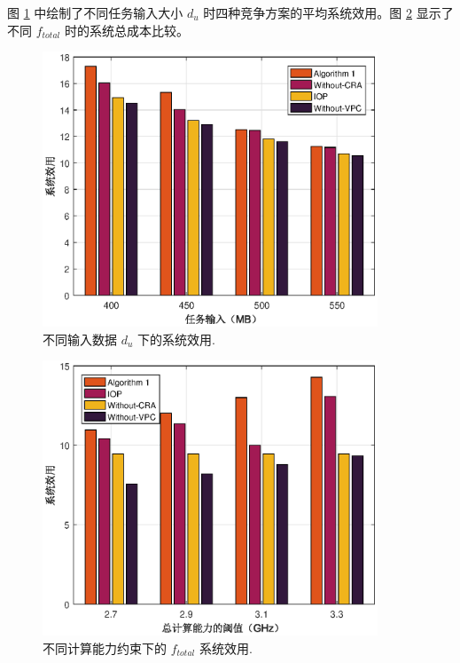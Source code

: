 图 \ref{F8} 中绘制了不同任务输入大小 $d_u$ 时四种竞争方案的平均系统效用。图 \ref{F9} 显示了不同 $f_{total}$ 时的系统总成本比较。
\begin{figure}[H]
\centering
\includegraphics[width=10cm]{figures//chap3//diff_dup.eps}
\caption{不同输入数据 $d_u$ 下的系统效用.}
\label{F8}
\end{figure}
\begin{figure}[H]
\centering
\includegraphics[width=10cm]{figures//chap3//diff_total.eps}
\caption{不同计算能力约束下的 $f_{total}$ 系统效用.}
\label{F9}
\end{figure}

